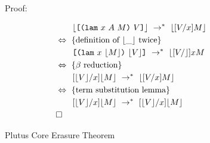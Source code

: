 \documentclass[../main.tex]{subfiles}
\begin{document}
\begin{figure*}
    Proof:
    
    \begin{align*}
        &\qquad\lfloor \texttt{[} \texttt{(} \texttt{lam} ~ x ~ A ~ M \texttt{)} ~ V \texttt{]} \rfloor ~ \rightarrow^* ~ \lfloor [V/x]M \rfloor\\
        &\Leftrightarrow~\textrm{\{definition of $\lfloor \_ \rfloor$ twice\}}\\
        &\qquad\texttt{[} \texttt{(} \texttt{lam} ~ x ~ \lfloor M \rfloor \texttt{)} ~ \lfloor V \rfloor \texttt{]} ~ \rightarrow^* ~ \lfloor [V/\rfloor]x{M}\\
        &\Leftrightarrow~\textrm{\{$\beta$ reduction\}}\\
        &\qquad[\lfloor V \rfloor/x]\lfloor M \rfloor ~ \rightarrow^* ~ \lfloor [V/x]M \rfloor\\
        &\Leftrightarrow~\textrm{\{term substitution lemma\}}\\
        &\qquad[\lfloor V \rfloor/x]\lfloor M \rfloor ~ \rightarrow^* ~ [\lfloor V \rfloor/x]\lfloor M \rfloor\\
        &\square{}
    \end{align*}
    
    
    
    
    
    \caption{Plutus Core Erasure Theorem}
    \label{fig:Plutus_core_erasure_theorem}
\end{figure*}
\end{document}
